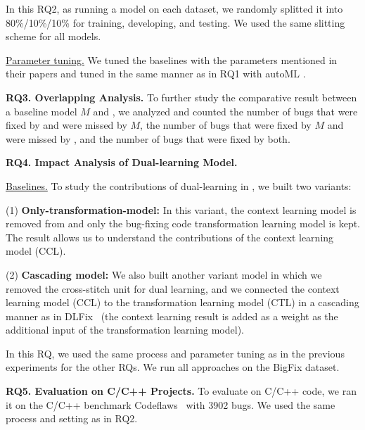 
In this RQ2, as running a model on each dataset, we randomly splitted
it into 80\%/10\%/10\% for training, developing, and testing. We used
the same slitting scheme for all models.


\underline{Parameter tuning.} We tuned the baselines with the
parameters mentioned in their papers and tuned {\tool} in the same
manner as in RQ1 with autoML \cite{NNI}.

{\bf RQ3. Overlapping Analysis.} To further study the comparative
result between a baseline model $M$ and {\tool}, we analyzed and
counted the number of bugs that were fixed by {\tool} and were missed
by $M$, the number of bugs that were fixed by $M$ and were missed
by {\tool}, and the number of bugs that were fixed by both.


{\bf RQ4. Impact Analysis of Dual-learning Model.}

\underline{Baselines.} To study the contributions of dual-learning in
{\tool}, we built two variants:

(1) \textbf{Only-transformation-model:} In this variant, the
context learning model is removed from {\tool} and only the bug-fixing
code transformation learning model is kept. The result allows us to
understand the contributions of the context learning model (CCL).


(2) \textbf{Cascading model:} We also built another variant model in
which we removed the cross-stitch unit for dual learning, and we
connected the context learning model (CCL) to the transformation
learning model (CTL) in a cascading manner as in DLFix~\cite{icse20}
(the context learning result is added as a weight
as the additional input of the transformation learning model).


In this RQ, we used the same process and parameter tuning as in the
previous experiments for the other RQs. 
We run all approaches on the BigFix dataset.


{\bf RQ5. Evaluation on C/C++ Projects.}  To evaluate {\tool} on C/C++
code, we ran it on the C/C++ benchmark
Codeflaws~\cite{tan2017codeflaws} with 3902 bugs. 
We used the same process and setting as in RQ2.
